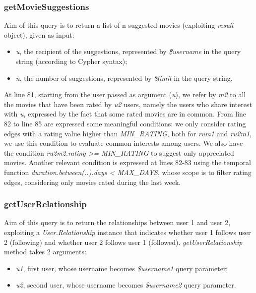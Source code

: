 \documentclass[11pt]{article}
\begin{document}
\subsubsection{getMovieSuggestions}
Aim of this query is to return a list of n suggested movies (exploiting \emph{result} object), given as input:
\begin{itemize}
    \item \emph{u}, the recipient of the suggestions, represented by \emph{\$username} in the query string (according to Cypher syntax);
    \item \emph{n}, the number of suggestions, represented by \emph{\$limit} in the query string.
\end{itemize}



At line 81, starting from the user passed as argument (\emph{u}), we refer by \emph{m2} to all the movies that have been rated by \emph{u2} users, namely the users who share interest with \emph{u}, expressed by the fact that some rated movies are in common. 
From line 82 to line 85 are expressed some meaningful conditions: we only consider rating edges with a rating value higher than \emph{MIN\_RATING}, both for \emph{rum1} and \emph{ru2m1}, we use this condition to evaluate common interests among users. We also have the condition \emph{ru2m2.rating >= MIN\_RATING} to suggest only appreciated movies. Another relevant condition is expressed at lines 82-83 using the temporal function \emph{duration.between(..).days < MAX\_DAYS}, whose scope is to filter rating edges, considering only movies rated during the last week. 

\subsubsection{getUserRelationship}
Aim of this query is to return the relationships between user 1 and user 2, exploiting a \emph{User.Relationship} instance that indicates whether user 1 follows user 2 (following) and whether user 2 follows user 1 (followed).
\emph{getUserRelationship} method takes 2 arguments:

\begin{itemize}
    \item \emph{u1}, first user, whose username becomes \emph{\$username1} query parameter;
    \item \emph{u2}, second user, whose username becomes \emph{\$username2} query parameter.
\end{itemize}
\end{document}
